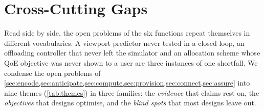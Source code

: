 \section{Cross-Cutting Gaps}\label{sec:synthesis}

Read side by side, the open problems of the six functions repeat themselves in different vocabularies.
A viewport predictor never tested in a closed loop, an offloading controller that never left the
simulator and an allocation scheme whose QoE objective was never shown to a user are three instances of
one shortfall. We condense the open problems of \cref{sec:encode,sec:anticipate,sec:compute,sec:provision,sec:connect,sec:assure}
into nine themes (\cref{tab:themes}) in three families: the \emph{evidence} that claims rest on, the
\emph{objectives} that designs optimise, and the \emph{blind spots} that most designs leave out.

